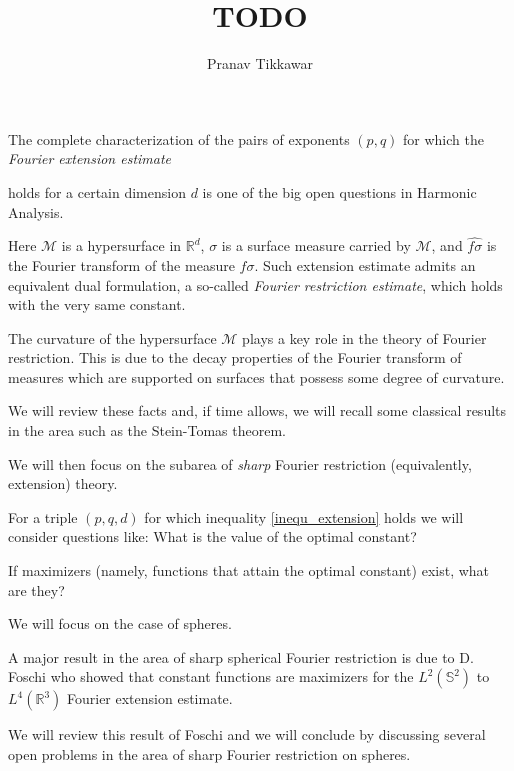 \documentclass{article}
\author{Pranav Tikkawar}
\title{TODO}
\begin{document}
\maketitle

The complete characterization of the pairs of exponents $(p,q)$ for which the \emph{Fourier extension estimate}



holds for a certain dimension $d$  is one of the big open questions in Harmonic Analysis. 

Here $\mathcal{M}$ is a hypersurface in $\mathbb{R}^d$, $\sigma$ is a surface measure carried by $\mathcal{M}$, and $\widehat{f\sigma}$ is the Fourier transform of the measure $f\sigma$.  Such extension estimate admits an equivalent dual formulation, a so-called \emph{Fourier restriction estimate}, which holds with the very same constant.

The curvature of the hypersurface $\mathcal{M}$ plays a key role in the theory of Fourier restriction. This is due to the decay properties of the Fourier transform of measures which are supported on surfaces that possess some degree of curvature. 


We will review these facts and, if time allows, we will recall some classical results in the area such as the Stein-Tomas theorem.


We will then focus on the subarea of \emph{sharp} Fourier restriction (equivalently, extension) theory.

For a triple $(p,q,d)$ for which inequality \eqref{inequ_extension} holds we will consider questions like: What is the value of the optimal constant? 

If maximizers (namely, functions that attain the optimal constant) exist, what are they? 

We will focus on the case of spheres. 

A major result in the area of sharp spherical Fourier restriction is due to D. Foschi who showed that constant functions are maximizers for the $L^2(\mathbb{S}^{2})$ to $L^4(\mathbb{R}^3)$ Fourier extension estimate. 


We will review this result of Foschi and we will conclude by discussing several open problems in the area of sharp Fourier restriction on spheres.
\end{document}
